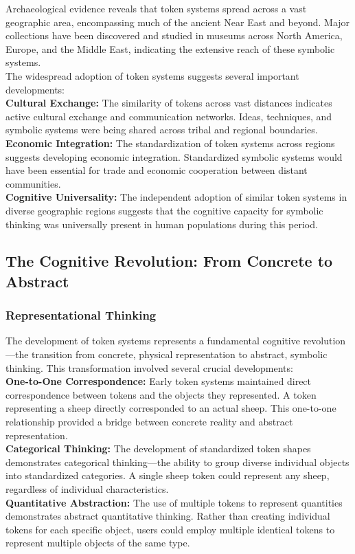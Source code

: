 \documentclass[12pt, oneside, openany]{book}
\begin{document}
Archaeological evidence reveals that token systems spread across a vast geographic area, encompassing much of the ancient Near East and beyond. Major collections have been discovered and studied in museums across North America, Europe, and the Middle East, indicating the extensive reach of these symbolic systems.\\
The widespread adoption of token systems suggests several important developments:\\
\textbf{Cultural Exchange:} The similarity of tokens across vast distances indicates active cultural exchange and communication networks. Ideas, techniques, and symbolic systems were being shared across tribal and regional boundaries.\\
\textbf{Economic Integration:} The standardization of token systems across regions suggests developing economic integration. Standardized symbolic systems would have been essential for trade and economic cooperation between distant communities.\\
\textbf{Cognitive Universality:} The independent adoption of similar token systems in diverse geographic regions suggests that the cognitive capacity for symbolic thinking was universally present in human populations during this period.

\subsection{The Cognitive Revolution: From Concrete to Abstract}

\subsubsection{Representational Thinking}

The development of token systems represents a fundamental cognitive revolution—the transition from concrete, physical representation to abstract, symbolic thinking. This transformation involved several crucial developments:\\
\textbf{One-to-One Correspondence:} Early token systems maintained direct correspondence between tokens and the objects they represented. A token representing a sheep directly corresponded to an actual sheep. This one-to-one relationship provided a bridge between concrete reality and abstract representation.\\
\textbf{Categorical Thinking:} The development of standardized token shapes demonstrates categorical thinking—the ability to group diverse individual objects into standardized categories. A single sheep token could represent any sheep, regardless of individual characteristics.\\
\textbf{Quantitative Abstraction:} The use of multiple tokens to represent quantities demonstrates abstract quantitative thinking. Rather than creating individual tokens for each specific object, users could employ multiple identical tokens to represent multiple objects of the same type.
\end{document}
